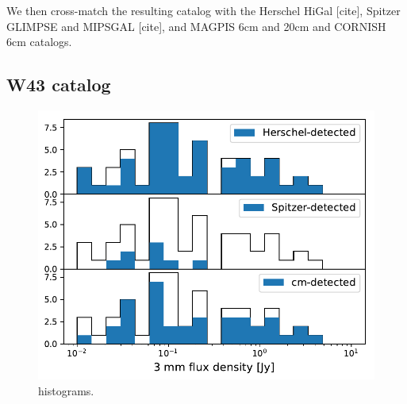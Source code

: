 \documentclass[twocolumn]{aastex62}
\begin{document}
We then cross-match the resulting catalog with the Herschel HiGal [cite],
Spitzer GLIMPSE and MIPSGAL [cite], and MAGPIS 6cm and 20cm and CORNISH 6cm
catalogs.

\subsection{W43 catalog}

\begin{figure}[htp]
    \includegraphics[scale=1]{figures/G31_dend_contour_thr4_minn20_mind1_detection_histograms.pdf}
\caption{histograms.}
\label{fig:histogram}
\end{figure}
\end{document}
